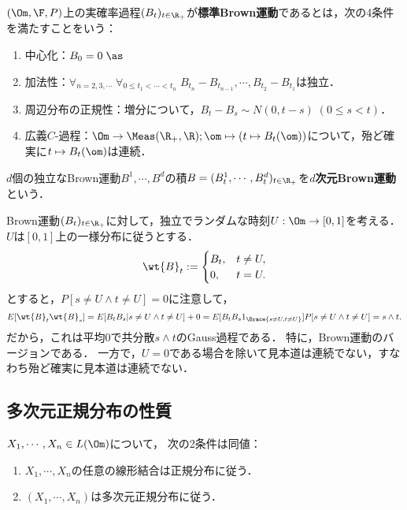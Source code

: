 \documentclass[uplatex,dvipdfmx]{jsreport}
\begin{document}
\begin{definition}
    $(\Om,\F,P)$上の実確率過程$(B_t)_{t\in\R_+}$が\textbf{標準Brown運動}であるとは，次の4条件を満たすことをいう：
    \begin{enumerate}[({B}1)]
        \item 中心化：$B_0=0\;\as$
        \item 加法性：$\forall_{n=2,3,\cdots}\;\forall_{0\le t_1<\cdots<t_n}\;B_{t_n}-B_{t_{n-1}},\cdots,B_{t_2}-B_{t_1}$は独立．
        \item 周辺分布の正規性：増分について，$B_t-B_s\sim N(0,t-s)\;(0\le s<t)$．
        \item 広義$C$-過程：$\Om\to\Meas(\R_+,\R);\om\mapsto(t\mapsto B_t(\om))$について，殆ど確実に$t\mapsto B_t(\om)$は連続．
    \end{enumerate}
    $d$個の独立なBrown運動$B^1,\cdots,B^d$の積$B=(B^1_t,\cdots,B^d_t)_{t\in\R_+}$を\textbf{$d$次元Brown運動}という．
\end{definition}
\begin{example}[Brown運動ではない例]
    Brown運動$(B_t)_{t\in\R_+}$に対して，独立でランダムな時刻$U:\Om\to[0,1]$を考える．$U$は$[0,1]$上の一様分布に従うとする．
    \[\wt{B}_t:=\begin{cases}
        B_t,&t\ne U,\\
        0,&t=U.
    \end{cases}\]
    とすると，$P[s\ne U\land t\ne U]=0$に注意して，
    \[E[\wt{B}_t\wt{B}_s]=E[B_tB_s|s\ne U\land t\ne U]+0=E[B_tB_s1_{\Brace{s\ne U,t\ne U}}]P[s\ne U\land t\ne U]=s\land t.\]
    だから，これは平均$0$で共分散$s\land t$のGauss過程である．
    特に，Brown運動のバージョンである．
    一方で，$U=0$である場合を除いて見本道は連続でない，すなわち殆ど確実に見本道は連続でない．
\end{example}

\subsection{多次元正規分布の性質}

\begin{lemma}[多次元正規分布の特徴付け]
    $X_1,\cdots,X_n\in L(\Om)$について，
    次の2条件は同値：
    \begin{enumerate}
        \item $X_1,\cdots,X_n$の任意の線形結合は正規分布に従う．
        \item $(X_1,\cdots,X_n)$は多次元正規分布に従う．
    \end{enumerate}
\end{lemma}
\end{document}
